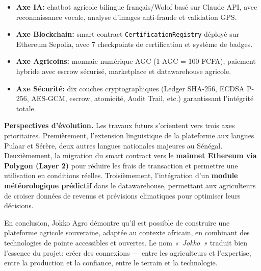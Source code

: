 \documentclass[12pt,a4paper]{report}
\begin{document}
\vspace{0.3cm}

\begin{tcolorbox}[infobox,title={Réalisations principales}]
  \begin{itemize}[itemsep=5pt]
    \item \textbf{Axe IA:} chatbot agricole bilingue français/Wolof basé sur Claude API,
          avec reconnaissance vocale, analyse d'images anti-fraude et validation GPS.
    \item \textbf{Axe Blockchain:} smart contract \texttt{CertificationRegistry} déployé
          sur Ethereum Sepolia, avec 7 checkpoints de certification et système de badges.
    \item \textbf{Axe Agricoins:} monnaie numérique AGC (1 AGC = 100 FCFA), paiement
          hybride avec escrow sécurisé, marketplace et datawarehouse agricole.
    \item \textbf{Axe Sécurité:} dix couches cryptographiques (Ledger SHA-256, ECDSA
          P-256, AES-GCM, escrow, atomicité, Audit Trail, etc.) garantissant l'intégrité totale.
  \end{itemize}
\end{tcolorbox}

\vspace{0.4cm}

\noindent
\textbf{Perspectives d'évolution.} Les travaux futurs s'orientent vers trois axes
prioritaires. Premièrement, l'extension linguistique de la plateforme aux langues
Pulaar et Sérère, deux autres langues nationales majeures au Sénégal. Deuxièmement,
la migration du smart contract vers le \textbf{mainnet Ethereum via Polygon (Layer 2)}
pour réduire les frais de transaction et permettre une utilisation en conditions réelles.
Troisièmement, l'intégration d'un \textbf{module météorologique prédictif} dans le
datawarehouse, permettant aux agriculteurs de croiser données de revenus et prévisions
climatiques pour optimiser leurs décisions.

\vspace{0.4cm}

\noindent
En conclusion, Jokko Agro démontre qu'il est possible de construire une plateforme
agricole souveraine, adaptée au contexte africain, en combinant des technologies de
pointe accessibles et ouvertes. Le nom \textit{«~Jokko~»} traduit bien l'essence du
projet: créer des connexions --- entre les agriculteurs et l'expertise, entre la
production et la confiance, entre le terrain et la technologie.
\end{document}
